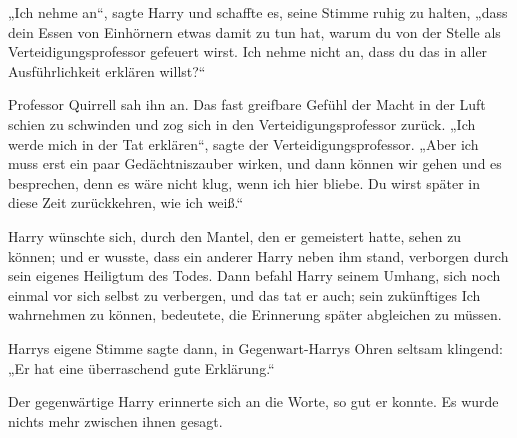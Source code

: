 „Ich nehme an“, sagte Harry und schaffte es, seine Stimme ruhig zu halten, „dass dein Essen von Einhörnern etwas damit zu tun hat, warum du von der Stelle als Verteidigungsprofessor gefeuert wirst. Ich nehme nicht an, dass du das in aller Ausführlichkeit erklären willst?“

Professor Quirrell sah ihn an. Das fast greifbare Gefühl der Macht in der Luft schien zu schwinden und zog sich in den Verteidigungsprofessor zurück.
„Ich werde mich in der Tat erklären“, sagte der Verteidigungsprofessor. „Aber ich muss erst ein paar Gedächtniszauber wirken, und dann können wir gehen und es besprechen, denn es wäre nicht klug, wenn ich hier bliebe. Du wirst später in diese Zeit zurückkehren, wie ich weiß.“

Harry wünschte sich, durch den Mantel, den er gemeistert hatte, sehen zu können; und er wusste, dass ein anderer Harry neben ihm stand, verborgen durch sein eigenes Heiligtum des Todes. Dann befahl Harry seinem Umhang, sich noch einmal vor sich selbst zu verbergen, und das tat er auch; sein zukünftiges Ich wahrnehmen zu können, bedeutete, die Erinnerung später abgleichen zu müssen.

Harrys eigene Stimme sagte dann, in Gegenwart-Harrys Ohren seltsam klingend: „Er hat eine überraschend gute Erklärung.“

Der gegenwärtige Harry erinnerte sich an die Worte, so gut er konnte. Es wurde nichts mehr zwischen ihnen gesagt.

